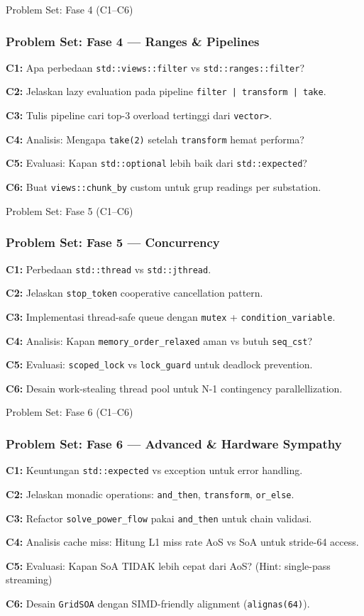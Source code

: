 \documentclass[aspectratio=169,10pt]{beamer}
\begin{document}
\begin{frame}[allowframebreaks]{Problem Set: Fase 4 (C1--C6)}
  \frametitle{Problem Set: Fase 4 — Ranges \& Pipelines}
  
  \textbf{C1:} Apa perbedaan \texttt{std::views::filter} vs \texttt{std::ranges::filter}?
  
  \textbf{C2:} Jelaskan lazy evaluation pada pipeline \texttt{filter | transform | take}.
  
  \textbf{C3:} Tulis pipeline cari top-3 overload tertinggi dari \texttt{vector\textlessBranch\textgreater}.
  
  \textbf{C4:} Analisis: Mengapa \texttt{take(2)} setelah \texttt{transform} hemat performa?
  
  \textbf{C5:} Evaluasi: Kapan \texttt{std::optional} lebih baik dari \texttt{std::expected}?
  
  \textbf{C6:} Buat \texttt{views::chunk_by} custom untuk grup readings per substation.
\end{frame}

\begin{frame}[allowframebreaks]{Problem Set: Fase 5 (C1--C6)}
  \frametitle{Problem Set: Fase 5 — Concurrency}
  
  \textbf{C1:} Perbedaan \texttt{std::thread} vs \texttt{std::jthread}.
  
  \textbf{C2:} Jelaskan \texttt{stop\_token} cooperative cancellation pattern.
  
  \textbf{C3:} Implementasi thread-safe queue dengan \texttt{mutex} + \texttt{condition\_variable}.
  
  \textbf{C4:} Analisis: Kapan \texttt{memory\_order\_relaxed} aman vs butuh \texttt{seq\_cst}?
  
  \textbf{C5:} Evaluasi: \texttt{scoped\_lock} vs \texttt{lock\_guard} untuk deadlock prevention.
  
  \textbf{C6:} Desain work-stealing thread pool untuk N-1 contingency parallellization.
\end{frame}

\begin{frame}[allowframebreaks]{Problem Set: Fase 6 (C1--C6)}
  \frametitle{Problem Set: Fase 6 — Advanced \& Hardware Sympathy}
  
  \textbf{C1:} Keuntungan \texttt{std::expected} vs exception untuk error handling.
  
  \textbf{C2:} Jelaskan monadic operations: \texttt{and\_then}, \texttt{transform}, \texttt{or\_else}.
  
  \textbf{C3:} Refactor \texttt{solve\_power\_flow} pakai \texttt{and\_then} untuk chain validasi.
  
  \textbf{C4:} Analisis cache miss: Hitung L1 miss rate AoS vs SoA untuk stride-64 access.
  
  \textbf{C5:} Evaluasi: Kapan SoA TIDAK lebih cepat dari AoS? (Hint: single-pass streaming)
  
  \textbf{C6:} Desain \texttt{GridSOA} dengan SIMD-friendly alignment (\texttt{alignas(64)}).
\end{frame}
\end{document}
